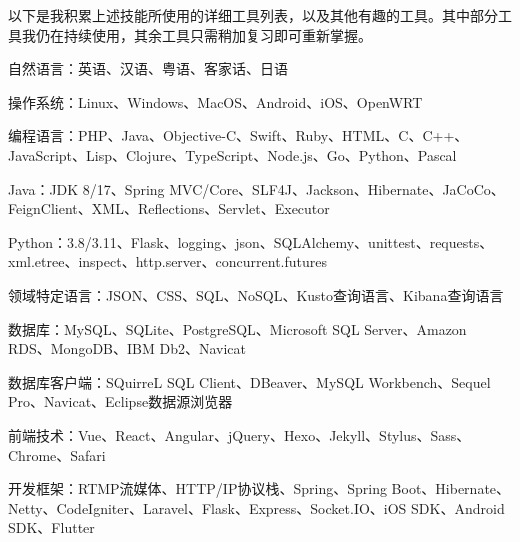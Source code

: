 

\begin{cvparagraph}
  以下是我积累上述技能所使用的详细工具列表，以及其他有趣的工具。其中部分工具我仍在持续使用，其余工具只需稍加复习即可重新掌握。
\end{cvparagraph}

\begin{cventries}

  \cventry
    {} %
    {} %
    {} %
    {} %
    {
      \begin{cvitems}
        \item {自然语言：英语、汉语、粤语、客家话、日语}
        \item {操作系统：Linux、Windows、MacOS、Android、iOS、OpenWRT}
        \item {编程语言：PHP、Java、Objective-C、Swift、Ruby、HTML、C、C++、JavaScript、Lisp、Clojure、TypeScript、Node.js、Go、Python、Pascal}
        \item {Java：JDK 8/17、Spring MVC/Core、SLF4J、Jackson、Hibernate、JaCoCo、FeignClient、XML、Reflections、Servlet、Executor}
        \item {Python：3.8/3.11、Flask、logging、json、SQLAlchemy、unittest、requests、xml.etree、inspect、http.server、concurrent.futures}
        \item {领域特定语言：JSON、CSS、SQL、NoSQL、Kusto查询语言、Kibana查询语言}
        \item {数据库：MySQL、SQLite、PostgreSQL、Microsoft SQL Server、Amazon RDS、MongoDB、IBM Db2、Navicat}
        \item {数据库客户端：SQuirreL SQL Client、DBeaver、MySQL Workbench、Sequel Pro、Navicat、Eclipse数据源浏览器}
        \item {前端技术：Vue、React、Angular、jQuery、Hexo、Jekyll、Stylus、Sass、Chrome、Safari}
        \item {开发框架：RTMP流媒体、HTTP/IP协议栈、Spring、Spring Boot、Hibernate、Netty、CodeIgniter、Laravel、Flask、Express、Socket.IO、iOS SDK、Android SDK、Flutter}

\end{cvitems}}
\end{cventries}
